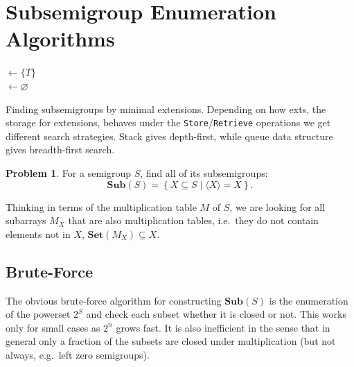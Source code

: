 \documentclass{amsart}
\newcommand{\Sub}{\mathbf{Sub}}
\newcommand{\Set}{\mathbf{Set}}
\theoremstyle{plain}
\theoremstyle{definition}
\newtheorem{problem}[theorem]{Problem}
\begin{document}
\section{Subsemigroup Enumeration Algorithms}
\label{sec:enum}
\begin{algorithm}[t]
\BlankLine
\Name{}
\subs $\leftarrow \{T\}$\\
\exts $\leftarrow \varnothing$\\
\Return \subs
\caption{Finding subsemigroups by minimal extensions. Depending on how \textsf{exts}, the storage for extensions, behaves under the \texttt{Store}/\texttt{Retrieve} operations we get different search strategies. Stack gives depth-first, while queue data structure gives breadth-first search.}
\label{alg:minclosure}
\end{algorithm}

\begin{problem}
For a semigroup $S$, find all of its subsemigroups:
$$\Sub(S)=\left\{ X\subseteq S\mid \langle X\rangle=X\right\}.$$
\end{problem}
Thinking in terms of the multiplication table $M$ of $S$, we are looking for all subarrays $M_X$ that are also multiplication tables, i.e.\ they do not contain elements not in $X$, $\Set(M_X)\subseteq X$.

\subsection{Brute-Force}
The obvious brute-force algorithm for constructing $\Sub(S)$ is the enumeration of the powerset $2^S$ and check each subset whether it is closed or not.
This works only for small cases as $2^n$ grows fast.
It is also inefficient in the sense that in general only a fraction of the subsets are closed under multiplication (but not always, e.g.\ left zero semigroups).
\end{document}
